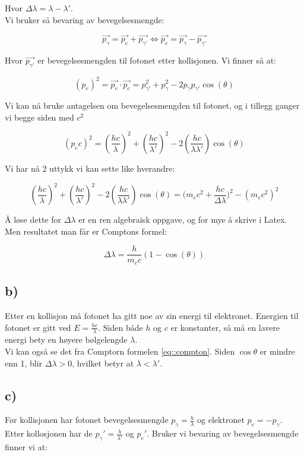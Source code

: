 \documentclass[a4paper,norsk, 10pt]{article}
\begin{document}
Hvor $\Delta \lambda = \lambda - \lambda'$.\\

Vi bruker så bevaring av bevegelsesmengde:

$$
\vec{p_{\gamma}} = \vec{p_e} + \vec{p_{\gamma'}} \Leftrightarrow \vec{p_{e}} = \vec{p_{\gamma}} - \vec{p_{\gamma'}}
$$

Hvor $\vec{p_{\gamma'}}$ er bevegelsesmengden til fotonet etter kollisjonen. Vi finner så at:

$$
(p_e)^2 = \vec{p_e} \cdot \vec{p_e} = p_{\gamma'}^2 + p_{\gamma}^2 - 2p_{\gamma}p_{\gamma'}\cos(\theta)
$$

Vi kan nå bruke antagelsen om bevegelsesmengden til fotonet, og i tillegg ganger vi begge siden med $c^2$

\begin{equation}
(p_ec)^2 = \left(\frac{hc}{\lambda}\right)^2 + \left(\frac{hc}{\lambda'}\right)^2 - 2\left(\frac{hc}{\lambda \lambda'}\right)\cos(\theta)
\end{equation}\label{eq::p2c22}

Vi har nå 2 uttykk vi kan sette like hverandre:

$$
\left(\frac{hc}{\lambda}\right)^2 + \left(\frac{hc}{\lambda'}\right)^2 - 2\left(\frac{hc}{\lambda \lambda'}\right)\cos(\theta) = \big(m_ec^2 + \frac{hc}{\Delta \lambda} \big)^2 - (m_ec^2)^2
$$

Å løse dette for $\Delta \lambda$ er en ren algebraisk oppgave, og for mye å skrive i Latex. Men resultatet man får er Comptons formel:

\begin{equation}
\Delta \lambda = \frac{h}{m_ec}(1-\cos(\theta))
\end{equation}\label{eq::compton}


\subsection*{b)}

Etter en kollisjon må fotonet ha gitt noe av sin energi til elektronet. Energien til fotonet er gitt ved $E = \frac{hc}{\lambda}$. Siden både $h$ og $c$ er konstanter, så må en lavere energi bety en høyere bølgelengde $\lambda$.\\

Vi kan også se det fra Comptorn formelen \ref{eq::compton}. Siden $\cos\theta$ er mindre enn 1, blir $\Delta \lambda > 0$, hvilket betyr at $\lambda < \lambda'$.

\subsection*{c)}
Før kollisjonen har fotonet bevegelsesmengde $p_{\gamma} = \frac{h}{\lambda}$ og elektronet $p_e = - p_{\gamma}$. Etter kollosjonen har de $p_{\gamma}' = \frac{h}{\lambda'}$ og $p_e'$. Bruker vi bevaring av bevegelsesmengde finner vi at:
\end{document}
